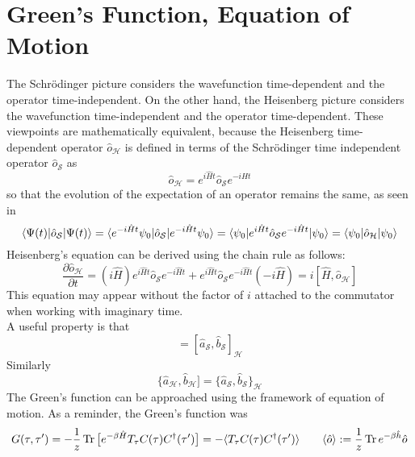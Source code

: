 \documentclass{article}
\begin{document}
\section{Green's Function, Equation of Motion}
The Schr\"{o}dinger picture considers the wavefunction time-dependent and the operator time-independent. On the other hand, the Heisenberg picture considers the wavefunction time-independent and the operator time-dependent. These viewpoints are mathematically equivalent, because the Heisenberg time-dependent operator $\hat{o}_{\mathcal{H}}$ is defined in terms of the Schr\"odinger time independent operator $\hat{o}_{\mathcal{S}}$ as 
\begin{equation*} \hat{o}_{\mathcal{H}} = e^{i\hat{H}t}\hat{o}_{\mathcal{S}}e^{-i\hat{H}t}\end{equation*}
so that the evolution of the expectation of an operator remains the same, as seen in 
\begin{equation*} \braket{\Psi(t)|\hat{o}_\mathcal{S}|\Psi(t)} = \braket{e^{-i\hat{H}t}\psi_0|\hat{o}_\mathcal{S}|e^{-i\hat{H}t}\psi_0} = \braket{\psi_0|e^{i\hat{H}t}\hat{o}_\mathcal{S}e^{-i\hat{H}t}|\psi_0} = \braket{\psi_0|\hat{o}_\mathcal{H}|\psi_0}\end{equation*}
Heisenberg's equation can be derived using the chain rule as follows:
\begin{equation*} \frac{\partial \hat{o}_\mathcal{H}}{\partial t} = (i\hat{H})e^{i\hat{H}t}\hat{o}_\mathcal{S}e^{-i\hat{H}t} + e^{i\hat{H}t}\hat{o}_\mathcal{S}e^{-i\hat{H}t}(-i\hat{H}) = i[\hat{H}, \hat{o}_\mathcal{H}]\end{equation*} 
This equation may appear without the factor of $i$ attached to the commutator when working with imaginary time. \\
A useful property is that 
\begin{equation*}[\hat{a}_\mathcal{H}, \hat{b}_\mathcal{H}] = [\hat{a}_\mathcal{S}, \hat{b}_\mathcal{S}]_\mathcal{H} \end{equation*}
Similarly 
\begin{equation*}\{\hat{a}_\mathcal{H}, \hat{b}_\mathcal{H}] = \{\hat{a}_\mathcal{S}, \hat{b}_\mathcal{S}\}_\mathcal{H} \end{equation*}
The Green's function can be approached using the framework of equation of motion. As a reminder, the Green's function was 
\begin{equation*}G(\tau, \tau') = -\frac{1}{z}\operatorname{Tr}\big[e^{-\beta\hat{H}}T_\tau C(\tau)C^\dagger(\tau')\big] = -\langle T_\tau C(\tau)C^\dagger(\tau') \rangle \qquad \langle \hat{o} \rangle := \frac{1}{z}\operatorname{Tr} e^{-\beta\hat{h}}\hat{o}   \end{equation*}
\end{document}
